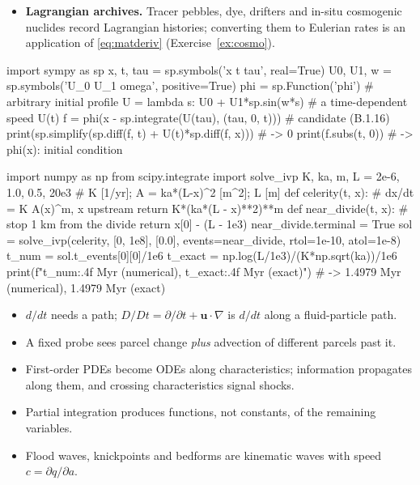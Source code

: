 \documentclass[11pt,letterpaper]{article}
\numberwithin{equation}{section}
\newcommand{\uu}{\mathbf{u}}
\begin{document}
\begin{research}[conservation law $+$ flux law $=$ kinematic wave]
\begin{itemize}[leftmargin=1.2em]
        $q_s\propto\bar u\propto1/(\zeta-z_b)$, with $\zeta$ the water surface) gives
        $c=(1-\lambda_p)^{-1}\partial q_s/\partial z_b>0$ with $\partial c/\partial z_b>0$. Crests move faster than troughs, so lee faces steepen
        into avalanche faces --- shocks in the sense of \cref{fig:characteristics}b. Section~\ref{sec:B2} turns
        this around to measure bedload by ``dune tracking''.
  \item \textbf{Lagrangian archives.} Tracer pebbles, dye, drifters and in-situ cosmogenic nuclides record
        Lagrangian histories; converting them to Eulerian rates is an application of \eqref{eq:matderiv}
        (Exercise~\ref{ex:cosmo}).
\end{itemize}
\end{research}

\begin{pycode}
import sympy as sp
x, t, tau = sp.symbols('x t tau', real=True)
U0, U1, w = sp.symbols('U_0 U_1 omega', positive=True)
phi = sp.Function('phi')                  # arbitrary initial profile
U = lambda s: U0 + U1*sp.sin(w*s)         # a time-dependent speed U(t)
f = phi(x - sp.integrate(U(tau), (tau, 0, t)))       # candidate (B.1.16)
print(sp.simplify(sp.diff(f, t) + U(t)*sp.diff(f, x)))   # -> 0
print(f.subs(t, 0))                       # -> phi(x): initial condition

import numpy as np
from scipy.integrate import solve_ivp
K, ka, m, L = 2e-6, 1.0, 0.5, 20e3   # K [1/yr]; A = ka*(L-x)^2 [m^2]; L [m]
def celerity(t, x):                  # dx/dt = K A(x)^m, x upstream
    return K*(ka*(L - x)**2)**m
def near_divide(t, x):               # stop 1 km from the divide
    return x[0] - (L - 1e3)
near_divide.terminal = True
sol = solve_ivp(celerity, [0, 1e8], [0.0], events=near_divide,
                rtol=1e-10, atol=1e-8)
t_num = sol.t_events[0][0]/1e6
t_exact = np.log(L/1e3)/(K*np.sqrt(ka))/1e6
print(f"{t_num:.4f} Myr (numerical), {t_exact:.4f} Myr (exact)")
# -> 1.4979 Myr (numerical), 1.4979 Myr (exact)
\end{pycode}

\begin{remember}
\begin{itemize}
  \item $d/dt$ needs a path; $D/Dt=\partial/\partial t+\uu\cdot\nabla$ is $d/dt$ along a fluid-particle path.
  \item A fixed probe sees parcel change \emph{plus} advection of different parcels past it.
  \item First-order PDEs become ODEs along characteristics; information propagates along them, and crossing
        characteristics signal shocks.
  \item Partial integration produces functions, not constants, of the remaining variables.
  \item Flood waves, knickpoints and bedforms are kinematic waves with speed $c=\partial q/\partial a$.
\end{itemize}
\end{remember}
\end{document}

